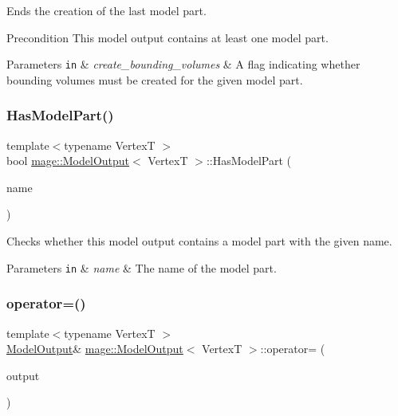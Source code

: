 Ends the creation of the last model part.

\begin{DoxyPrecond}{Precondition}
This model output contains at least one model part. 
\end{DoxyPrecond}

\begin{DoxyParams}[1]{Parameters}
\mbox{\tt in}  & {\em create\+\_\+bounding\+\_\+volumes} & A flag indicating whether bounding volumes must be created for the given model part. \\
\hline
\end{DoxyParams}
\hypertarget{structmage_1_1_model_output_a90c6d42d13813b9c340bd1a250276a8d}{}\label{structmage_1_1_model_output_a90c6d42d13813b9c340bd1a250276a8d} 
\subsubsection{\texorpdfstring{Has\+Model\+Part()}{HasModelPart()}}
{\footnotesize\ttfamily template$<$typename VertexT $>$ \\
bool \hyperlink{structmage_1_1_model_output}{mage\+::\+Model\+Output}$<$ VertexT $>$\+::Has\+Model\+Part (\begin{DoxyParamCaption}\item[{const string \&}]{name }\end{DoxyParamCaption})\hspace{0.3cm}{\ttfamily [noexcept]}}

Checks whether this model output contains a model part with the given name.


\begin{DoxyParams}[1]{Parameters}
\mbox{\tt in}  & {\em name} & The name of the model part. \\
\hline
\end{DoxyParams}
\hypertarget{structmage_1_1_model_output_a8b7a5462238fb3b32f584199c19018d5}{}\label{structmage_1_1_model_output_a8b7a5462238fb3b32f584199c19018d5} 
\subsubsection{\texorpdfstring{operator=()}{operator=()}\hspace{0.1cm}{\footnotesize\ttfamily [1/2]}}
{\footnotesize\ttfamily template$<$typename VertexT $>$ \\
\hyperlink{structmage_1_1_model_output}{Model\+Output}\& \hyperlink{structmage_1_1_model_output}{mage\+::\+Model\+Output}$<$ VertexT $>$\+::operator= (\begin{DoxyParamCaption}\item[{const \hyperlink{structmage_1_1_model_output}{Model\+Output}$<$ VertexT $>$ \&}]{output }\end{DoxyParamCaption})\hspace{0.3cm}{\ttfamily [delete]}}

